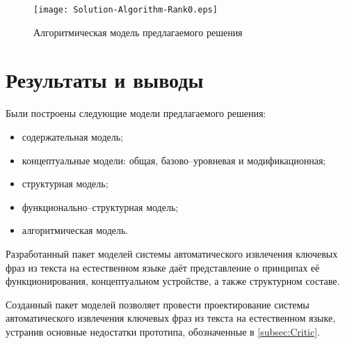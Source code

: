 \begin{figure}[!ht]
  \centering
  \texttt{[image: Solution-Algorithm-Rank0.eps]}
  \caption{Алгоритмическая модель предлагаемого решения}
  \label{fig:Solution-Algorithm-Rank0}
\end{figure}

\section{Результаты и выводы}
Были построены следующие модели предлагаемого решения:
\begin{itemize}
  \item содержательная модель;
  \item концептуальные модели: общая, базово--уровневая и
модификационная;
  \item структурная модель;
  \item функционально--структурная модель;
  \item алгоритмическая модель.
\end{itemize}

Разработанный пакет моделей системы автоматического извлечения
ключевых фраз из текста на естественном языке даёт представление
о принципах её функционирования, концептуальном устройстве,
а также структурном составе.

Созданный пакет моделей позволяет провести проектирование системы
автоматического извлечения ключевых фраз из текста на естественном
языке, устранив основные недостатки прототипа, обозначенные в
\ref{subsec:Critic}.
